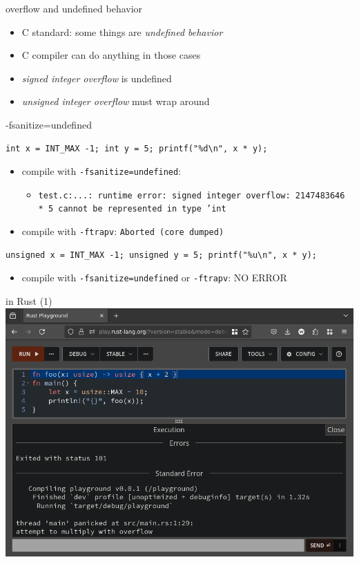 \begin{frame}{overflow and undefined behavior}
\begin{itemize}
\item C standard: some things are \textit{undefined behavior}
\item C compiler can do anything in those cases
\vspace{.5cm}
\item \textit{signed integer overflow} is undefined
\item \textit{unsigned integer overflow} must wrap around
\end{itemize}
\end{frame}

\begin{frame}[fragile]{-fsanitize=undefined}
\begin{Verbatim}[fontsize=\small]
int x = INT_MAX -1; int y = 5; printf("%d\n", x * y);
\end{Verbatim}
\begin{itemize}
\item compile with \texttt{-fsanitize=undefined}:
    \begin{itemize}
        \item \texttt{test.c:...: runtime error: signed integer overflow: 2147483646 * 5 cannot be represented in type 'int}
    \end{itemize}
\item compile with \texttt{-ftrapv}: \texttt{Aborted (core dumped)}
\end{itemize}
\begin{Verbatim}[fontsize=\small]
unsigned x = INT_MAX -1; unsigned y = 5; printf("%u\n", x * y);
\end{Verbatim}
\begin{itemize}
\item compile with \texttt{-fsanitize=undefined} or \texttt{-ftrapv}: NO ERROR
\end{itemize}
\end{frame}

\begin{frame}[fragile]{in Rust (1)}
\includegraphics[height=0.9\textheight]{../overflow-int/rust-oflow-trap}
\end{frame}

